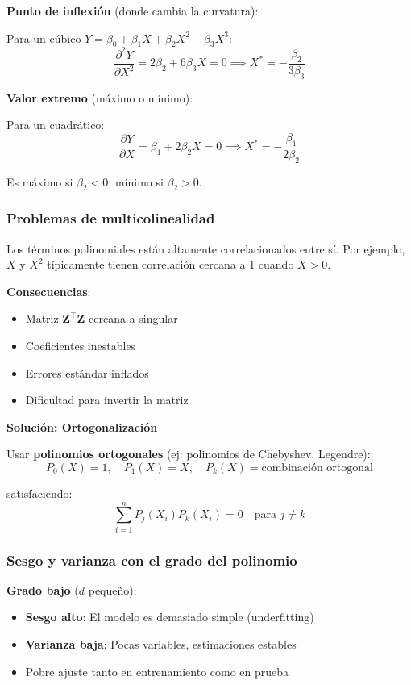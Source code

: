\documentclass[
  doc,
  floatsintext,
  longtable,
  a4paper,
  nolmodern,
  notxfonts,
  notimes,
  12pt,
  colorlinks=true,linkcolor=blue,citecolor=blue,urlcolor=blue]{apa7}
\providecommand{\tightlist}{%
  \setlength{\itemsep}{0pt}\setlength{\parskip}{0pt}}
\begin{document}
\textbf{Punto de inflexión} (donde cambia la curvatura):

Para un cúbico \(Y = \beta_0 + \beta_1 X + \beta_2 X^2 + \beta_3 X^3\):
\[
\frac{\partial^2 Y}{\partial X^2} = 2\beta_2 + 6\beta_3 X = 0 \implies X^* = -\frac{\beta_2}{3\beta_3}
\]

\textbf{Valor extremo} (máximo o mínimo):

Para un cuadrático: \[
\frac{\partial Y}{\partial X} = \beta_1 + 2\beta_2 X = 0 \implies X^* = -\frac{\beta_1}{2\beta_2}
\]

Es máximo si \(\beta_2 < 0\), mínimo si \(\beta_2 > 0\).

\subsubsection{Problemas de
multicolinealidad}\label{problemas-de-multicolinealidad}

Los términos polinomiales están altamente correlacionados entre sí. Por
ejemplo, \(X\) y \(X^2\) típicamente tienen correlación cercana a 1
cuando \(X > 0\).

\textbf{Consecuencias}:

\begin{itemize}
\tightlist
\item
  Matriz \(\mathbf{Z}^\top\mathbf{Z}\) cercana a singular
\item
  Coeficientes inestables
\item
  Errores estándar inflados
\item
  Dificultad para invertir la matriz
\end{itemize}

\textbf{Solución: Ortogonalización}

Usar \textbf{polinomios ortogonales} (ej: polinomios de Chebyshev,
Legendre): \[
P_0(X) = 1, \quad P_1(X) = X, \quad P_k(X) = \text{combinación ortogonal}
\]

satisfaciendo: \[
\sum_{i=1}^{n} P_j(X_i) P_k(X_i) = 0 \quad \text{para } j \neq k
\]

\subsubsection{Sesgo y varianza con el grado del
polinomio}\label{sesgo-y-varianza-con-el-grado-del-polinomio}

\textbf{Grado bajo} (\(d\) pequeño):

\begin{itemize}
\tightlist
\item
  \textbf{Sesgo alto}: El modelo es demasiado simple (underfitting)
\item
  \textbf{Varianza baja}: Pocas variables, estimaciones estables
\item
  Pobre ajuste tanto en entrenamiento como en prueba
\end{itemize}
\end{document}
